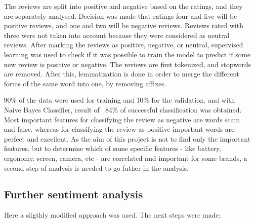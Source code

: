 \documentclass[11pt]{article}
\begin{document}
The reviews are split into positive and negative based on the ratings, and they are separately analysed. Decision was made that ratings four and five will be positive reviews, and one and two will be negative reviews. Reviews rated with three were not taken into account because they were considered as neutral reviews. After marking the reviews as positive, negative, or neutral, supervised learning was used to check if it was possible to train the model to predict if some new review is positive or negative. The reviews are first tokenized, and stopwords are removed. After this, lemmatization is done in order to merge the different forms of the same word into one, by removing affixes. \par


90\% of the data were used for training and 10\% for the validation, and with Naive Bayes Classifier, result of ~84\% of successful classification was obtained. Most important features for classifying the review as negative are words scam and false, whereas for classifying the review as positive important words are perfect and excellent. As the aim of this project is not to find only the important features, but to determine which of some specific features - like battery, ergonomy, screen, camera, etc - are correlated and important for some brands, a second step of analysis is needed to go futher in the analysis.


\subsection{Further sentiment analysis} 

Here a sligthly modified approach was used. The next steps were made: 
\end{document}
